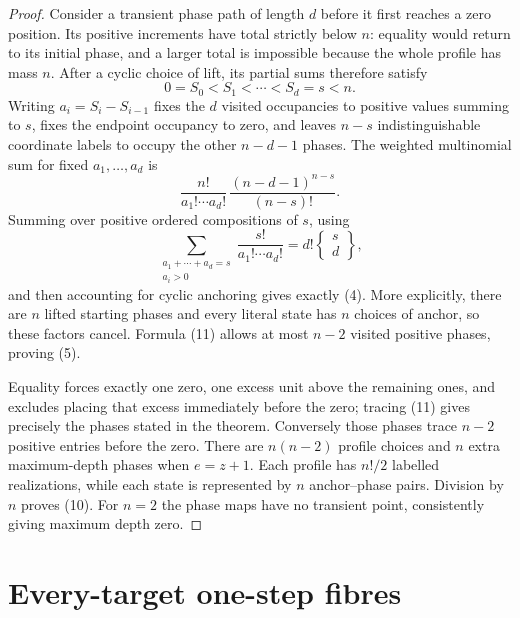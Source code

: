 \documentclass[a4paper,10pt]{amsart}
\theoremstyle{remark}
\begin{document}
\begin{proof}
Consider a transient phase path of length $d$ before it first reaches a
zero position.  Its positive increments have total strictly below $n$:
equality would return to its initial phase, and a larger total is
impossible because the whole profile has mass $n$.  After a cyclic choice
of lift, its partial sums therefore satisfy
\begin{equation}
 0=S_0<S_1<\cdots<S_d=s<n.
\end{equation}
Writing $a_i=S_i-S_{i-1}$ fixes the $d$ visited occupancies to positive
values summing to $s$, fixes the endpoint occupancy to zero, and leaves
$n-s$ indistinguishable coordinate labels to occupy the other $n-d-1$
phases.  The weighted multinomial sum for fixed $a_1,\ldots,a_d$ is
\[
 \frac{n!}{a_1!\cdots a_d!}\,
 \frac{(n-d-1)^{n-s}}{(n-s)!}.
\]
Summing over positive ordered compositions of $s$, using
\[
 \sum_{\substack{a_1+\cdots+a_d=s\\a_i>0}}
 \frac{s!}{a_1!\cdots a_d!}
 =d!\left\{\begin{matrix}s\\d\end{matrix}\right\},
\]
and then accounting for cyclic anchoring gives exactly (4).  More
explicitly, there are $n$ lifted starting phases and every literal state
has $n$ choices of anchor, so these factors cancel.  Formula (11) allows
at most $n-2$ visited positive phases, proving (5).

Equality forces exactly one zero, one excess unit above the remaining
ones, and excludes placing that excess immediately before the zero;
tracing (11) gives precisely the phases stated in the theorem.  Conversely
those phases trace $n-2$ positive entries before the zero.  There are
$n(n-2)$ profile choices and $n$ extra maximum-depth phases when
$e=z+1$.  Each profile has $n!/2$ labelled realizations, while each state
is represented by $n$ anchor--phase pairs.  Division by $n$ proves (10).
For $n=2$ the phase maps have no transient point, consistently giving
maximum depth zero.
\end{proof}

\section{Every-target one-step fibres}
\end{document}
